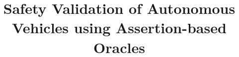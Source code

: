 \documentclass[letterpaper, 10 pt, journal, twoside]{IEEEtran}
\begin{document}
\title{Safety Validation of Autonomous Vehicles using Assertion-based Oracles}

\end{document}
